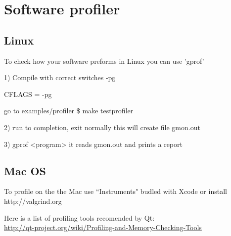 \documentclass[10pt,letterpaper]{article}
\begin{document}
%
%
%
%
%
%


\newpage
\section{Software profiler}

\subsection{Linux}
To check how your software preforms in Linux you can use 'gprof'

1) Compile with correct switches 
-pg

CFLAGS = -pg 

go to examples/profiler
\$ make testprofiler

2) run to completion, exit normally 
this will create file gmon.out

3) gprof <program>
it reads gmon.out and prints a report

\subsection{Mac OS}
To profile on the the Mac use ``Instruments" budled with Xcode
or install
http://valgrind.org

Here is a list of profiling tools recomended by Qt: \\
\url{http://qt-project.org/wiki/Profiling-and-Memory-Checking-Tools}
\end{document}
